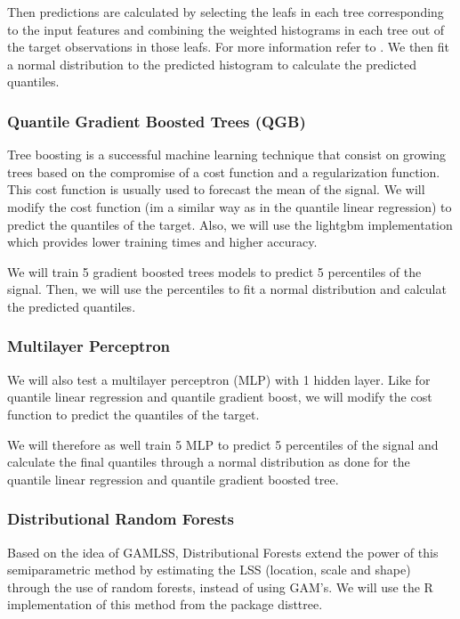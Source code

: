 \documentclass[a4paper,3p,sort&compress]{elsarticle}
\begin{document}
Then predictions are calculated by selecting the leafs in each tree
corresponding to the input features and combining the weighted
histograms in each tree out of the target observations in those leafs.
For more information refer to \cite{quantregforests}.
We then fit a normal distribution to the predicted histogram to calculate 
the predicted quantiles.

\subsubsection{Quantile Gradient Boosted Trees (QGB)}

Tree boosting \cite{friedman_greedy_2001} is a successful
machine learning technique that consist on growing trees based on the
compromise of a cost function and a regularization function. This cost
function is usually used to forecast the mean of the signal. We will
modify the cost function (im a similar way as in the quantile linear
regression) to predict the quantiles of the target. Also, we will use 
the lightgbm implementation \cite{ke_lightgbm:_2017} which provides 
lower training times and higher accuracy.

We will train 5 gradient boosted trees models to predict 5 percentiles
of the \no signal. Then, we will use the percentiles to fit a normal
distribution and calculat the predicted quantiles.

\subsubsection{Multilayer Perceptron}

We will also test a multilayer perceptron (MLP) 
\cite{ramchoun_multilayer_2016} with 1 hidden layer. 
Like for quantile linear regression and quantile gradient boost, 
we will modify the cost function to predict the quantiles of the target.

We will therefore as well train 5 MLP to predict 5 percentiles of the \no signal
and calculate the final quantiles through a normal distribution as done 
for the quantile linear regression 
and quantile gradient boosted tree.

\subsubsection{Distributional Random Forests}

Based on the idea of GAMLSS, Distributional Forests 
\cite{schlosser_distributional_2019} extend the power 
of this semiparametric method by estimating the LSS 
(location, scale and shape) through the use of random forests, 
instead of using GAM's. We will use the R implementation of this 
method from the package disttree.
\end{document}
